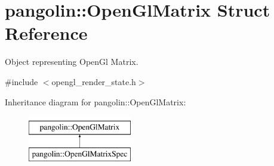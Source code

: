 \hypertarget{structpangolin_1_1_open_gl_matrix}{}\section{pangolin\+:\+:Open\+Gl\+Matrix Struct Reference}
\label{structpangolin_1_1_open_gl_matrix}


Object representing Open\+Gl Matrix.  




{\ttfamily \#include $<$opengl\+\_\+render\+\_\+state.\+h$>$}

Inheritance diagram for pangolin\+:\+:Open\+Gl\+Matrix\+:\begin{figure}[H]
\begin{center}
\leavevmode
\includegraphics[height=2.000000cm]{structpangolin_1_1_open_gl_matrix}
\end{center}
\end{figure}
